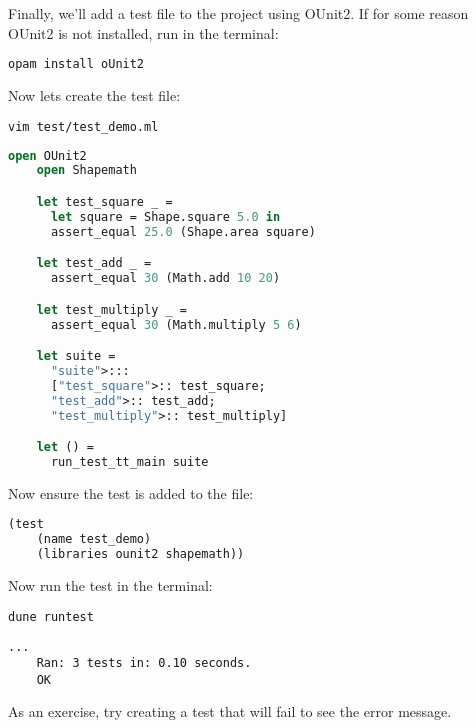 \begin{Example}

  Finally, we'll add a test file to the project using OUnit2. 
  If for some reason OUnit2 is not installed, run in the terminal:
  \begin{lstlisting}[language=OCaml, numbers=none]
    opam install oUnit2
  \end{lstlisting}
  Now lets create the test file:
  
  \begin{lstlisting}[language=OCaml, numbers=none]
    vim test/test_demo.ml
  \end{lstlisting}
  \begin{lstlisting}[language=OCaml, numbers=none]
    open OUnit2
    open Shapemath

    let test_square _ =
      let square = Shape.square 5.0 in
      assert_equal 25.0 (Shape.area square)

    let test_add _ =
      assert_equal 30 (Math.add 10 20)

    let test_multiply _ =
      assert_equal 30 (Math.multiply 5 6)

    let suite =
      "suite">:::
      ["test_square">:: test_square;
      "test_add">:: test_add;
      "test_multiply">:: test_multiply]

    let () =
      run_test_tt_main suite
  \end{lstlisting}
  \noindent
  Now ensure the test is added to the  file:
  \begin{lstlisting}[language=OCaml, numbers=none]
    (test
    (name test_demo)
    (libraries ounit2 shapemath))  
  \end{lstlisting}
  \noindent
  Now run the test in the terminal:
  \begin{lstlisting}[language=OCaml, numbers=none]
    dune runtest
  \end{lstlisting}
  \begin{lstlisting}[numbers=none]
    ...
    Ran: 3 tests in: 0.10 seconds.
    OK
  \end{lstlisting}
  \noindent
  As an exercise, try creating a test that will fail to see the error message.
  \end{Example}

  \newpage 

